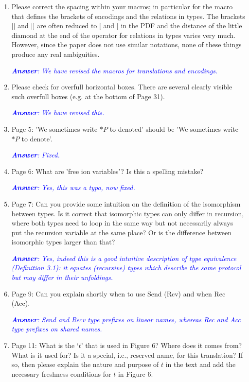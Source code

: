 \documentclass[11pt,a4paper]{article}
\newcommand{\answ}[1]{\smallskip \emph{\textcolor{blue}{\textbf{Answer}:  #1}}}
\begin{document}
\begin{enumerate}
\item Please correct the spacing within your macros; in particular for the macro
  that defines the brackets of encodings and the relations in types. The
  brackets $[|$ and $|]$ are often reduced to $[$ and $]$ in the PDF and the distance of
  the little diamond at the end of the operator for relations in types varies
  very much. However, since the paper does not use similar notations, none of
  these things produce any real ambiguities.
  
  \answ{We have revised the macros for translations and encodings.}
  
\item Please check for overfull horizontal boxes. There are several clearly visible
  such overfull boxes (e.g. at the bottom of Page 31).
  
  \answ{We have revised this.}
  
\item Page 5: 'We sometimes write $*P$ to denoted' should be 'We sometimes write $*P$ to
  denote'.
  
  \answ{Fixed.}
  
\item  Page 6: What are 'free ion variables'? Is this a spelling mistake?

\answ{Yes, this was a typo, now fixed.}

\item Page 7: Can you provide some intuition on the definition of the isomorphism
  between types. Is it correct that isomorphic types can only differ in
  recursion, where both types need to loop in the same way but not necessarily
  always put the recursion variable at the same place? Or is the difference
  between isomorphic types larger than that?
  
  \answ{Yes, indeed this is a good intuitive description of type equivalence (Definition 3.1): it  equates (recursive) types which describe the same protocol but may differ in their unfoldings.}
  
\item  Page 9: Can you explain shortly when to use Send (Rcv) and when Rec (Acc).

\answ{Send and Recv type prefixes on linear names, whereas Rec and Acc type prefixes on shared names.}

\item  Page 11: What is the `$t$' that is used in Figure 6? Where does it comes from?
  What is it used for? Is it a special, i.e., reserved name, for this
  translation? If so, then please explain the nature and purpose of $t$ in the
  text and add the necessary freshness conditions for $t$ in Figure 6.
  

\end{enumerate}
\end{document}
